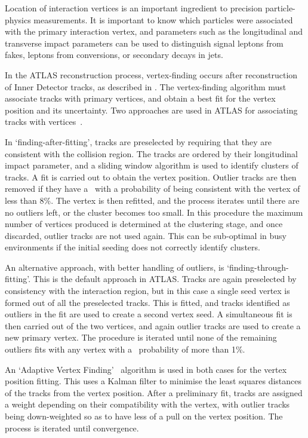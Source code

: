 Location of interaction vertices is an important ingredient to precision
particle-physics measurements. It is important to know which particles were
associated with the primary interaction vertex, and parameters such as the
longitudinal and transverse impact parameters can be used to distinguish signal
leptons from fakes, leptons from conversions, or secondary decays in jets.

In the ATLAS reconstruction process, vertex-finding occurs after reconstruction of
Inner Detector tracks, as described in . The
vertex-finding algorithm must associate tracks with primary vertices, and obtain
a best fit for the vertex position and its uncertainty. Two approaches are
used in ATLAS for associating tracks with vertices~\cite{1742-6596-119-3-032033}. 

In `finding-after-fitting',
tracks are preselected by requiring that they are consistent with the collision
region. The tracks are ordered by their longitudinal impact parameter, and a
sliding window algorithm is used to identify clusters of tracks. A fit is 
carried out to obtain the vertex position. Outlier tracks are then removed if
they have a \chisquared\ with a probability of being consistent with the vertex
of less than 8\%. The vertex is then refitted, and the process iterates until
there are no outliers left, or the cluster becomes too small. In this procedure
the maximum number of vertices produced is determined at the clustering stage, and
once discarded, outlier tracks are not used again. This can be sub-optimal in
busy environments if the initial seeding does not correctly identify clusters.

An alternative approach, with better handling of outliers, is
`finding-through-fitting'. This is the default approach in ATLAS. Tracks are
again preselected by consistency with the interaction region, but in this case a
single seed vertex is formed out of all the preselected tracks. This is fitted, and
tracks identified as outliers in the fit are used to create a second vertex
seed. A simultaneous fit is then carried out of the two vertices, and again
outlier tracks are used to create a new primary vertex. The procedure is
iterated until none of the remaining outliers fits with any vertex with a
\chisquared\ probability of more than 1\%.

An `Adaptive Vertex Finding'~\cite{0954-3899-34-12-N01} algorithm is used in
both cases for the vertex position fitting. 
This uses a Kalman filter to minimise the least squares distances of the tracks from
the vertex position. After a preliminary fit, tracks are assigned a
weight depending on their compatibility with the vertex, with outlier tracks
being down-weighted so as to have less of a pull on the vertex position. The
process is iterated until convergence.
